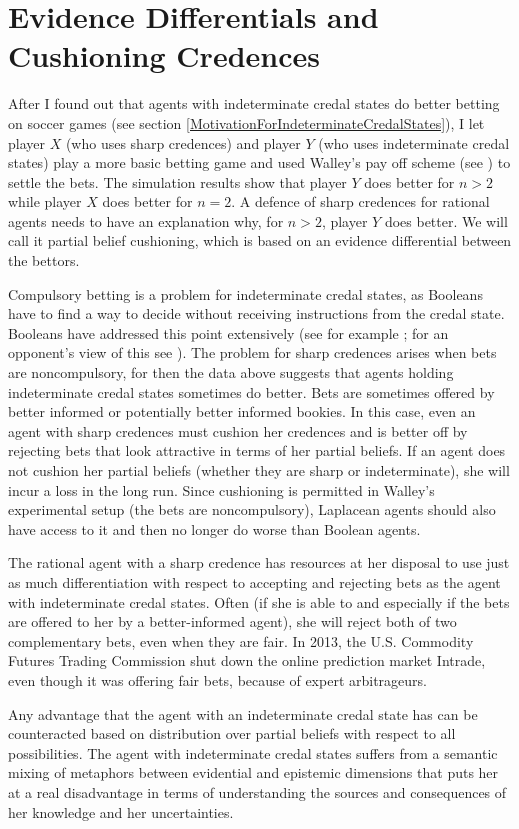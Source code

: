 \section{Evidence Differentials and Cushioning
  Credences}
\label{WalleysWorldCupWoes}

After I found out that agents with indeterminate credal
states do better betting on soccer games (see section
\ref{MotivationForIndeterminateCredalStates}), I let
player $X$ (who uses sharp credences) and player $Y$
(who uses indeterminate credal states) play a more
basic betting game and used Walley's pay off scheme
(see ) to settle the bets. The
simulation results show that player $Y$ does better for
$n>2$ while player $X$ does better for $n=2$. A defence
of sharp credences for rational agents needs to have an
explanation why, for $n>2$, player $Y$ does better. We
will call it partial belief cushioning, which is based
on an evidence differential between the bettors.

Compulsory betting is a problem for indeterminate
credal states, as Booleans have to find a way to decide
without receiving instructions from the credal state.
Booleans have addressed this point extensively (see for
example ; for an opponent's
view of this see ). The problem
for sharp credences arises when bets are noncompulsory,
for then the data above suggests that agents holding
indeterminate credal states sometimes do better. Bets
are sometimes offered by better informed or potentially
better informed bookies. In this case, even an agent
with sharp credences must cushion her credences and is
better off by rejecting bets that look attractive in
terms of her partial beliefs. If an agent does not
cushion her partial beliefs (whether they are sharp or
indeterminate), she will incur a loss in the long run.
Since cushioning is permitted in Walley's experimental
setup (the bets are noncompulsory), Laplacean agents
should also have access to it and then no longer do
worse than Boolean agents.

The rational agent with a sharp credence has resources
at her disposal to use just as much differentiation
with respect to accepting and rejecting bets as the
agent with indeterminate credal states. Often (if she
is able to and especially if the bets are offered to
her by a better-informed agent), she will reject both
of two complementary bets, even when they are fair. In
2013, the U.S. Commodity Futures Trading Commission
shut down the online prediction market Intrade, even
though it was offering fair bets, because of expert
arbitrageurs.

Any advantage that the agent with an indeterminate
credal state has can be counteracted based on
distribution over partial beliefs with respect to all
possibilities. The agent with indeterminate credal
states suffers from a semantic mixing of metaphors
between evidential and epistemic dimensions that puts
her at a real disadvantage in terms of understanding
the sources and consequences of her knowledge and her
uncertainties.
